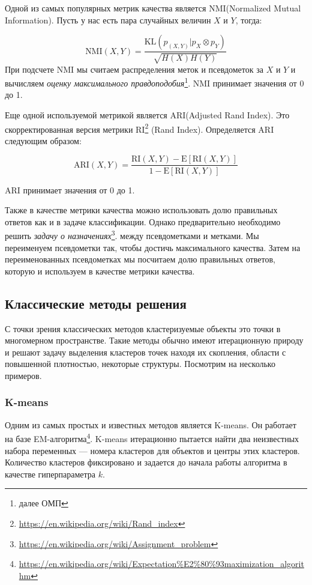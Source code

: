 \documentclass[a4paper,12pt]{extarticle}
\begin{document}
Одной из самых популярных метрик качества является NMI(Normalized Mutual Information).
Пусть у нас есть пара случайных величин $X$ и $Y$, тогда:

\[
	\text{NMI}(X,Y) = \frac{\text{KL}(p_{(X, Y)}| p_X \otimes p_Y)}{\sqrt{H(X)H(Y)}}
\]
При подсчете NMI мы считаем распределения меток и псевдометок 
за $X$ и $Y$ и вычисляем \textit{оценку максимального правдоподобия}\footnote{далее ОМП}. NMI 
принимает значения от 0 до 1.

Еще одной используемой метрикой является ARI(Adjusted Rand Index).
Это скорректированная версия метрики RI\footnote{\url{https://en.wikipedia.org/wiki/Rand_index}} (Rand Index).
Определяется ARI следующим образом:

\[
	\text{ARI}(X, Y) = \frac{\text{RI}(X, Y) - \text{E}[\text{RI}(X, Y)]}{1 - \text{E}[\text{RI}(X, Y)]}
\]

ARI принимает значения от 0 до 1.

Также в качестве метрики качества можно использовать долю 
правильных ответов как и в задаче классификации. Однако предварительно 
необходимо решить \textit{задачу о назначениях}\footnote{\url{https://en.wikipedia.org/wiki/Assignment_problem}}.
между псевдометками и метками.
Мы переименуем псевдометки так, чтобы достичь максимального качества.
Затем на переименованных псевдометках мы посчитаем долю правильных ответов, которую 
и используем в качестве метрики качества.

\subsection{Классические методы решения}

С точки зрения классических методов кластеризуемые
объекты это точки в многомерном пространстве. Такие
методы обычно имеют итерационную природу и решают 
задачу выделения кластеров точек находя их скопления, 
области с повышенной плотностью, некоторые структуры.
Посмотрим на несколько примеров.

\subsubsection{K-means}

Одним из самых простых и известных методов является
K-means. Он работает на базе EM-алгоритма\footnote{\url{https://en.wikipedia.org/wiki/Expectation\%E2\%80\%93maximization_algorithm}}.
K-means итерационно пытается найти два неизвестных набора переменных ---
номера кластеров для объектов и центры этих кластеров. 
Количество кластеров фиксировано и задается до начала 
работы алгоритма в качестве гиперпараметра $k$.
\end{document}
